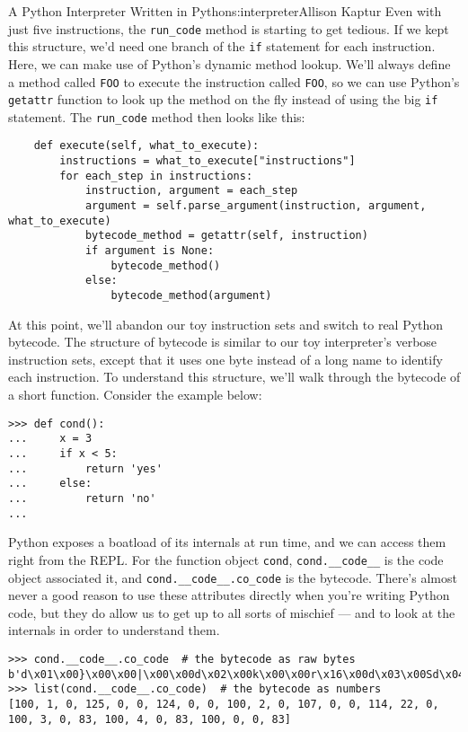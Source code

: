 \begin{aosachapter}{A Python Interpreter Written in Python}{s:interpreter}{Allison Kaptur}
Even with just five instructions, the \texttt{run\_code} method is
starting to get tedious. If we kept this structure, we'd need one branch
of the \texttt{if} statement for each instruction. Here, we can make use
of Python's dynamic method lookup. We'll always define a method called
\texttt{FOO} to execute the instruction called \texttt{FOO}, so we can
use Python's \texttt{getattr} function to look up the method on the fly
instead of using the big \texttt{if} statement. The \texttt{run\_code}
method then looks like this:

\begin{verbatim}
    def execute(self, what_to_execute):
        instructions = what_to_execute["instructions"]
        for each_step in instructions:
            instruction, argument = each_step
            argument = self.parse_argument(instruction, argument, what_to_execute)
            bytecode_method = getattr(self, instruction)
            if argument is None:
                bytecode_method()
            else:
                bytecode_method(argument)
\end{verbatim}

\label{real-python-bytecode}

At this point, we'll abandon our toy instruction sets and switch to real
Python bytecode. The structure of bytecode is similar to our toy
interpreter's verbose instruction sets, except that it uses one byte
instead of a long name to identify each instruction. To understand this
structure, we'll walk through the bytecode of a short function. Consider
the example below:

\begin{verbatim}
>>> def cond():
...     x = 3
...     if x < 5:
...         return 'yes'
...     else:
...         return 'no'
...
\end{verbatim}

Python exposes a boatload of its internals at run time, and we can
access them right from the REPL. For the function object \texttt{cond},
\texttt{cond.\_\_code\_\_} is the code object associated it, and
\texttt{cond.\_\_code\_\_.co\_code} is the bytecode. There's almost
never a good reason to use these attributes directly when you're writing
Python code, but they do allow us to get up to all sorts of mischief ---
and to look at the internals in order to understand them.

\begin{verbatim}
>>> cond.__code__.co_code  # the bytecode as raw bytes
b'd\x01\x00}\x00\x00|\x00\x00d\x02\x00k\x00\x00r\x16\x00d\x03\x00Sd\x04\x00Sd\x00\x00S'
>>> list(cond.__code__.co_code)  # the bytecode as numbers
[100, 1, 0, 125, 0, 0, 124, 0, 0, 100, 2, 0, 107, 0, 0, 114, 22, 0, 100, 3, 0, 83, 100, 4, 0, 83, 100, 0, 0, 83]
\end{verbatim}


\end{aosachapter}
